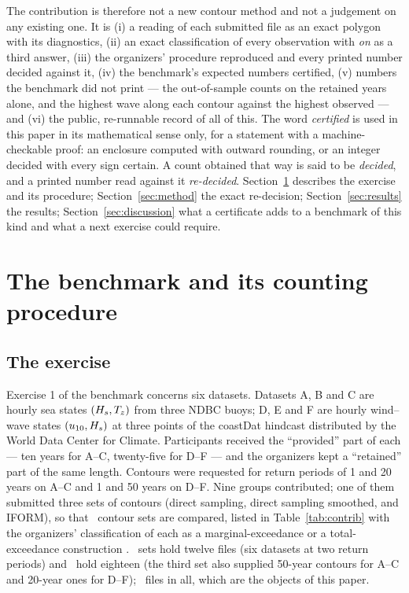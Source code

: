 \documentclass[preprint,11pt,authoryear]{elsarticle}
\begin{document}
The contribution is therefore not a new contour method and not a judgement on any existing one. It is (i) a reading of each submitted file as an exact polygon with its diagnostics, (ii) an exact classification of every observation with \emph{on} as a third answer, (iii) the organizers' procedure reproduced and every printed number decided against it, (iv) the benchmark's expected numbers certified, (v) numbers the benchmark did not print --- the out-of-sample counts on the retained years alone, and the highest wave along each contour against the highest observed --- and (vi) the public, re-runnable record of all of this. The word \emph{certified} is used in this paper in its mathematical sense only, for a statement with a machine-checkable proof: an enclosure computed with outward rounding, or an integer decided with every sign certain. A count obtained that way is said to be \emph{decided}, and a printed number read against it \emph{re-decided}. Section~\ref{sec:benchmark} describes the exercise and its procedure; Section~\ref{sec:method} the exact re-decision; Section~\ref{sec:results} the results; Section~\ref{sec:discussion} what a certificate adds to a benchmark of this kind and what a next exercise could require.

\section{The benchmark and its counting procedure}\label{sec:benchmark}

\subsection{The exercise}
Exercise 1 of the benchmark \citep{haselsteiner2021} concerns six datasets. Datasets A, B and C are hourly sea states $(H_s, T_z)$ from three NDBC buoys; D, E and F are hourly wind--wave states $(u_{10}, H_s)$ at three points of the coastDat hindcast distributed by the World Data Center for Climate. Participants received the ``provided'' part of each --- ten years for A--C, twenty-five for D--F --- and the organizers kept a ``retained'' part of the same length. Contours were requested for return periods of 1 and 20 years on A--C and 1 and 50 years on D--F. Nine groups contributed; one of them submitted three sets of contours (direct sampling, direct sampling smoothed, and IFORM), so that \EContributions\ contour sets are compared, listed in Table~\ref{tab:contrib} with the organizers' classification of each as a marginal-exceedance or a total-exceedance construction \citep{mackay2021}. \EFilesTwelve\ sets hold twelve files (six datasets at two return periods) and \EFilesEighteen\ hold eighteen (the third set also supplied 50-year contours for A--C and 20-year ones for D--F); \EContours\ files in all, which are the objects of this paper.
\end{document}
